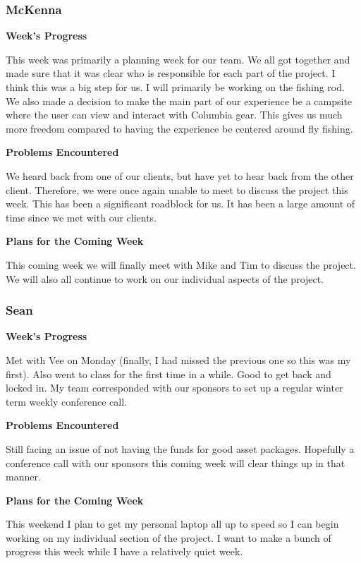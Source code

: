 \documentclass[10pt,journal,compsoc,onecolumn, draftclsnofoot]{IEEEtran}
\begin{document}
\subsubsection{McKenna}
\noindent \textbf{Week's Progress}

This week was primarily a planning week for our team. We all got together and made sure that it was clear who is responsible for each part of the project. I think this was a big step for us. I will primarily be working on the fishing rod. We also made a decision to make the main part of our experience be a campsite where the user can view and interact with Columbia gear. This gives us much more freedom compared to having the experience be centered around fly fishing.

\noindent \textbf{Problems Encountered}

We heard back from one of our clients, but have yet to hear back from the other client. Therefore, we were once again unable to meet to discuss the project this week. This has been a significant roadblock for us. It has been a large amount of time since we met with our clients.

\noindent \textbf{Plans for the Coming Week}

This coming week we will finally meet with Mike and Tim to discuss the project. We will also all continue to work on our individual aspects of the project.

\subsubsection{Sean}
\noindent \textbf{Week's Progress}

Met with Vee on Monday (finally, I had missed the previous one so this was my first). Also went to class for the first time in a while. Good to get back and locked in. My team corresponded with our sponsors to set up a regular winter term weekly conference call.

\noindent \textbf{Problems Encountered}

Still facing an issue of not having the funds for good asset packages.  Hopefully a conference call with our sponsors this coming week will clear things up in that manner.

\noindent \textbf{Plans for the Coming Week}

This weekend I plan to get my personal laptop all up to speed so I can begin working on my individual section of the project. I want to make a bunch of progress this week while I have a relatively quiet week.
\end{document}
